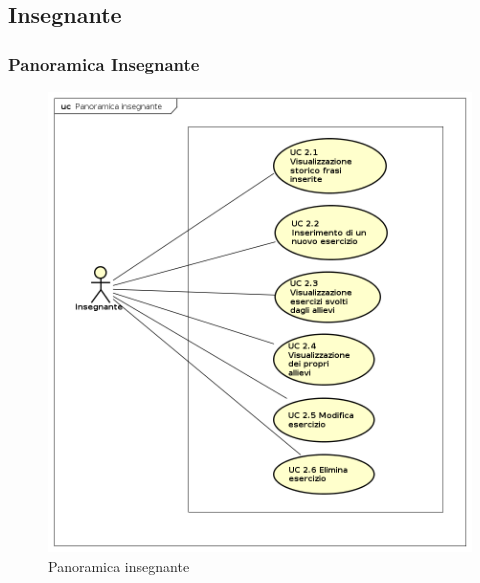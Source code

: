 
\subsection{Insegnante}

\subsubsection{Panoramica Insegnante}

\begin{figure}[H]
\centering
\includegraphics[width=14cm]{img/PanoramicaInsegnanti.png} 
\caption{Panoramica insegnante}
\end{figure}




